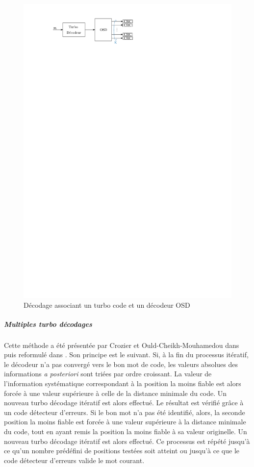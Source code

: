 \begin{figure}[tb]
\begin{center}
	\includegraphics[]{main/ch1_fig/abaiss/osd.pdf}
	\end{center}
	\caption{Décodage associant un turbo code et un décodeur OSD \label{fig:osd}}
\end{figure}

\subparagraph{Multiples turbo décodages} Cette méthode a été présentée par Crozier et Ould-Cheikh-Mouhamedou dans \cite{cim} puis reformulé dans \cite{fsm}. Son principe est le suivant. Si, à la fin du processus itératif, le décodeur n'a pas convergé vers le bon mot de code, les valeurs absolues des informations \textit{a posteriori} sont triées par ordre croissant. La valeur de l'information systématique correspondant à la position la moins fiable est alors forcée à une valeur supérieure à celle de la distance minimale du code. Un nouveau turbo décodage itératif est alors effectué. Le résultat est vérifié grâce à un code détecteur d'erreurs. Si le bon mot n'a pas été identifié, alors, la seconde position la moins fiable est forcée à une valeur supérieure à la distance minimale du code, tout en ayant remis la position la moins fiable à sa valeur originelle. Un nouveau turbo décodage itératif est alors effectué. Ce processus est répété jusqu'à ce qu'un nombre prédéfini de positions testées soit atteint ou jusqu'à ce que le code détecteur d'erreurs valide le mot courant.

